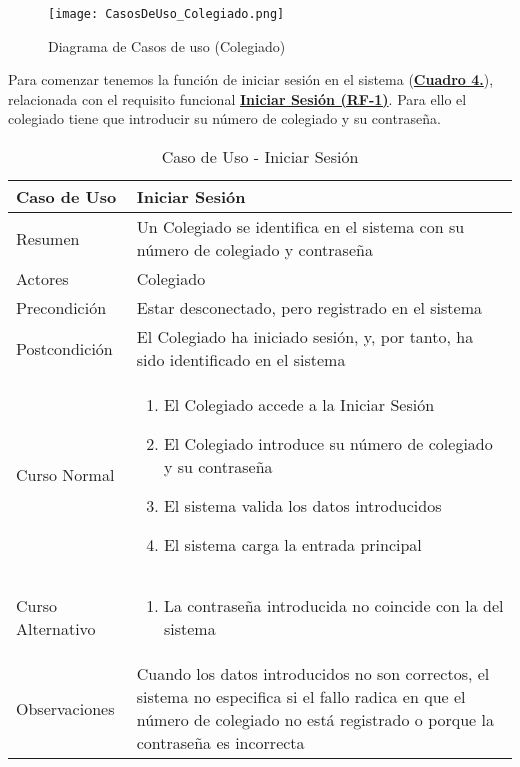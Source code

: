 \begin{figure}[!htbp]
  \centering
  \texttt{[image: CasosDeUso\_Colegiado.png]}
  \caption{Diagrama de Casos de uso (Colegiado)}
  \label{fig:CasosDeUso_Colegiado}
\end{figure}
\FloatBarrier

\addtocounter{tabla}{1}
Para comenzar tenemos la función de iniciar sesión en el sistema (\textbf{\hyperref[tab:cucIniSes]{Cuadro 4.}}), relacionada con el requisito funcional \textbf{\hyperref[tab:rfIniSes]{Iniciar Sesión (RF-1)}}. Para ello el colegiado tiene que introducir su número de colegiado y su contraseña.

\begin{table}[!h]
  \centering  \addtocounter{casouso}{1}
  \begin{tabular}{|l | p{100mm}|}
    \textbf{Caso de Uso}  & \textbf{Iniciar Sesión} \\ \hline
    Resumen 		 & Un Colegiado se identifica en el sistema con su número de colegiado y contraseña \\ \hline
    Actores  		 & Colegiado \\ \hline
    Precondición  	 & Estar desconectado, pero registrado en el sistema \\ \hline
    Postcondición  	 & El Colegiado ha iniciado sesión, y, por tanto, ha sido identificado en el sistema \\ \hline
    Curso Normal   	 & \begin{enumerate}
	  \item El Colegiado accede a la Iniciar Sesión
	  \item El Colegiado introduce su número de colegiado y su contraseña
	  \item El sistema valida los datos introducidos
	  \item El sistema carga la entrada principal
    \end{enumerate}  \\ \hline
    Curso Alternativo  & \begin{enumerate}
	  \item La contraseña introducida no coincide con la del sistema
    \end{enumerate}  \\ \hline
    Observaciones 	 & Cuando los datos introducidos no son correctos, el sistema no especifica si el fallo radica en que el número de colegiado no está registrado o porque la contraseña es incorrecta  \\ \hline
  \end{tabular}
  \caption{Caso de Uso  - Iniciar Sesión}
  \label{tab:cucIniSes}
\end{table}
\FloatBarrier

